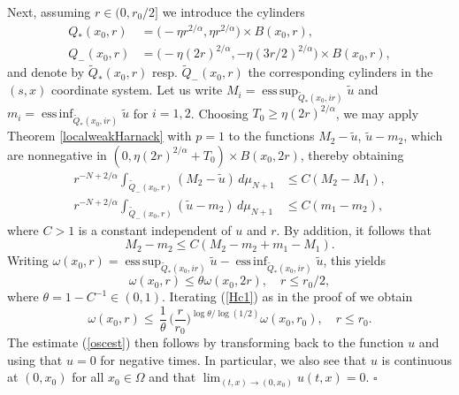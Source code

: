 \documentclass[10pt]{article}
\DeclareMathOperator*{\esup}{ess\,sup}
\DeclareMathOperator*{\einf}{ess\,inf}
\begin{document}
Next, assuming $r\in (0,r_0/2]$ we introduce the cylinders
\begin{align*}
Q_*(x_0,r) & =\big(-\eta r^{2/\alpha},\eta r^{2/\alpha}\big)\times
B(x_0,r),\\
Q_-(x_0,r) & =\big(-\eta (2r)^{2/\alpha},-\eta
(3r/2)^{2/\alpha}\big)\times B(x_0,r),
\end{align*}
and denote by $\tilde{Q}_*(x_0,r)$ resp. $\tilde{Q}_-(x_0,r)$ the
corresponding cylinders in the $(s,x)$ coordinate system. Let us
write $M_i=\esup_{\tilde{Q}_*(x_0,ir)}\tilde{u}$ and
$m_i=\einf_{\tilde{Q}_*(x_0,ir)}\tilde{u}$ for $i=1,2$. Choosing
$T_0\ge\eta (2r)^{2/\alpha}$, we may apply Theorem
\ref{localweakHarnack} with $p=1$ to the functions $M_2-\tilde{u}$,
$\tilde{u}-m_2$, which are nonnegative in $(0,\eta
(2r)^{2/\alpha}+T_0)\times B(x_0,2r)$, thereby obtaining
\begin{align*}
r^{-N+2/\alpha}\int_{\tilde{Q}_-(x_0,r)}(M_2-\tilde{u})\,d\mu_{N+1}
& \le C(M_2-M_1),\\
r^{-N+2/\alpha}\int_{\tilde{Q}_-(x_0,r)}(\tilde{u}-m_2)\,d\mu_{N+1}
& \le C(m_1-m_2),
\end{align*}
where $C>1$ is a constant independent of $u$ and $r$. By addition,
it follows that
\[
M_2-m_2\le C(M_2-m_2+m_1-M_1).
\]
Writing
$\omega(x_0,r)=\esup_{\tilde{Q}_*(x_0,ir)}\tilde{u}-\einf_{\tilde{Q}_*(x_0,ir)}\tilde{u}$,
this yields
\begin{equation} \label{Hc1}
\omega(x_0,r)\le \theta \omega(x_0,2r),\quad r\le r_0/2,
\end{equation}
where $\theta=1-C^{-1}\in (0,1)$. Iterating (\ref{Hc1}) as in the
proof of \cite[Lemma 8.23]{GilTrud} we obtain
\[
\omega(x_0,r)\le \,\frac{1}{\theta}\,\Big(\frac{r}{r_0}\Big)^{\log
\theta/\log(1/2)}\omega(x_0,r_0),\quad r\le r_0.
\]
The estimate (\ref{oscest}) then follows by transforming back to the
function $u$ and using that $u=0$ for negative times. In particular,
we also see that $u$ is continuous at $(0,x_0)$ for all $x_0\in
\Omega$ and that $\lim_{(t,x)\to (0,x_0)}u(t,x)=0$. $\square$

$\mbox{}$
\end{document}

